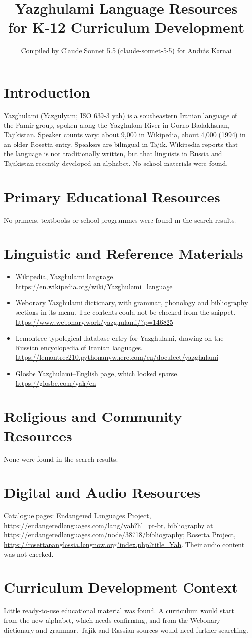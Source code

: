 \documentclass[12pt]{article}
\title{Yazghulami Language Resources for K-12 Curriculum Development}
\author{Compiled by Claude Sonnet 5.5 (claude-sonnet-5-5) for Andr\'as Kornai}
\date{}
\begin{document}
\maketitle

\section{Introduction}
Yazghulami (Yazgulyam; ISO 639-3 yah) is a southeastern Iranian language of the Pamir group, spoken along the Yazghulom River in Gorno-Badakhshan, Tajikistan. Speaker counts vary: about 9,000 in Wikipedia, about 4,000 (1994) in an older Rosetta entry. Speakers are bilingual in Tajik. Wikipedia reports that the language is not traditionally written, but that linguists in Russia and Tajikistan recently developed an alphabet. No school materials were found.

\section{Primary Educational Resources}
No primers, textbooks or school programmes were found in the search results.

\section{Linguistic and Reference Materials}
\begin{itemize}
\item Wikipedia, Yazghulami language. \url{https://en.wikipedia.org/wiki/Yazghulami_language}
\item Webonary Yazghulami dictionary, with grammar, phonology and bibliography sections in its menu. The contents could not be checked from the snippet. \url{https://www.webonary.work/yazghulami/?p=146825}
\item Lemontree typological database entry for Yazghulami, drawing on the Russian encyclopedia of Iranian languages. \url{https://lemontree210.pythonanywhere.com/en/doculect/yazghulami}
\item Glosbe Yazghulami--English page, which looked sparse. \url{https://glosbe.com/yah/en}
\end{itemize}

\section{Religious and Community Resources}
None were found in the search results.

\section{Digital and Audio Resources}
Catalogue pages: Endangered Languages Project, \url{https://endangeredlanguages.com/lang/yah?hl=pt-br}, bibliography at \url{https://endangeredlanguages.com/node/38718/bibliography}; Rosetta Project, \url{https://rosettapanglossia.longnow.org/index.php?title=Yah}. Their audio content was not checked.

\section{Curriculum Development Context}
Little ready-to-use educational material was found. A curriculum would start from the new alphabet, which needs confirming, and from the Webonary dictionary and grammar. Tajik and Russian sources would need further searching.
\end{document}
